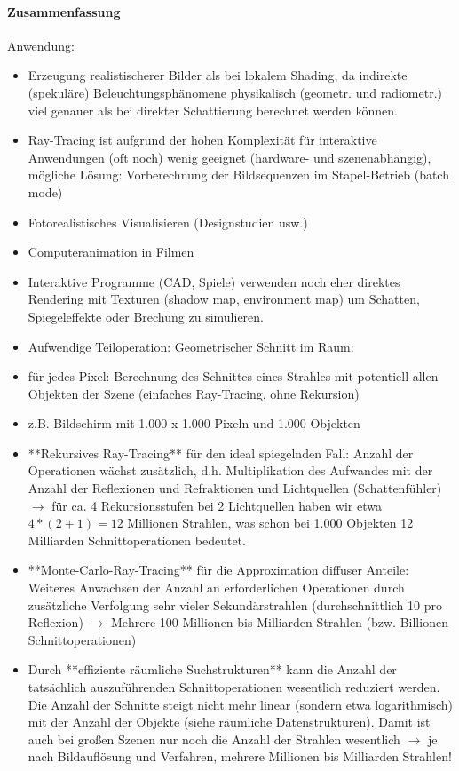 \documentclass[10pt,landscape]{article}
\begin{document}
\begin{multicols}{3}
\paragraph{Zusammenfassung}
Anwendung:
\begin{itemize}
  \item Erzeugung realistischerer Bilder als bei lokalem Shading, da indirekte (spekuläre) Beleuchtungsphänomene physikalisch (geometr. und radiometr.) viel genauer als bei direkter Schattierung berechnet werden können.
  \item Ray-Tracing ist aufgrund der hohen Komplexität für interaktive Anwendungen (oft noch) wenig geeignet (hardware- und szenenabhängig), mögliche Lösung: Vorberechnung der Bildsequenzen im Stapel-Betrieb (batch mode)
  \item Fotorealistisches Visualisieren (Designstudien usw.)
  \item Computeranimation in Filmen
  \item Interaktive Programme (CAD, Spiele) verwenden noch eher direktes Rendering mit Texturen (shadow map, environment map) um Schatten, Spiegeleffekte oder Brechung zu simulieren.
  \item Aufwendige Teiloperation: Geometrischer Schnitt im Raum:
  \item für jedes Pixel: Berechnung des Schnittes eines Strahles mit potentiell allen Objekten der Szene (einfaches Ray-Tracing, ohne Rekursion)
  \item z.B. Bildschirm mit 1.000 x 1.000 Pixeln und 1.000 Objekten
  \item **Rekursives Ray-Tracing** für den ideal spiegelnden Fall: Anzahl der Operationen wächst zusätzlich, d.h. Multiplikation des Aufwandes mit der Anzahl der Reflexionen und Refraktionen und Lichtquellen (Schattenfühler) $\rightarrow$ für ca. 4 Rekursionsstufen bei 2 Lichtquellen haben wir etwa $4*(2 + 1) = 12$ Millionen Strahlen, was schon bei 1.000 Objekten 12 Milliarden Schnittoperationen bedeutet.
  \item **Monte-Carlo-Ray-Tracing** für die Approximation diffuser Anteile: Weiteres Anwachsen der Anzahl an erforderlichen Operationen durch zusätzliche Verfolgung sehr vieler Sekundärstrahlen (durchschnittlich 10 pro Reflexion) $\rightarrow$ Mehrere 100 Millionen bis Milliarden Strahlen (bzw. Billionen Schnittoperationen)
  \item Durch **effiziente räumliche Suchstrukturen** kann die Anzahl der tatsächlich auszuführenden Schnittoperationen wesentlich reduziert werden. Die Anzahl der Schnitte steigt nicht mehr linear (sondern etwa logarithmisch) mit der Anzahl der Objekte (siehe räumliche Datenstrukturen). Damit ist auch bei großen Szenen nur noch die Anzahl der Strahlen wesentlich $\rightarrow$ je nach Bildauflösung und Verfahren, mehrere Millionen bis Milliarden Strahlen!

\end{itemize}
\end{multicols}
\end{document}

